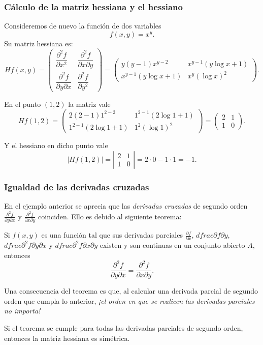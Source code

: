 \begin{frame}
\frametitle{Cálculo de la matriz hessiana y el hessiano}
Consideremos de nuevo la función de dos variables
\[f(x,y)=x^y.\]
Su matriz hessiana es:
\[
Hf(x,y)=\left(
\begin{array}{cc}
\dfrac{\partial^2 f}{\partial x^2} & \dfrac{\partial^2 f}{\partial x \partial y}\\
\dfrac{\partial^2 f}{\partial y \partial x} & \dfrac{\partial^2 f}{\partial y^2} 
\end{array}
\right)
=
\left(
\begin{array}{cc}
y(y-1)x^{y-2} & x^{y-1}(y\log x+1) \\
x^{y-1}(y\log x+1) & x^y(\log x)^2
\end{array}
\right).
\]

En el punto $(1,2)$ la matriz vale
\[
Hf(1,2)=\left(
\begin{array}{cc}
2(2-1)1^{2-2} & 1^{2-1}(2\log 1+1) \\
1^{2-1}(2\log 1+1) & 1^2(\log 1)^2
\end{array}
\right)
=
\left(
\begin{array}{cc}
2 & 1 \\
1 & 0 
\end{array}
\right).
\]

Y el hessiano en dicho punto vale
\[ |Hf(1,2)|=\left|
\begin{array}{cc}
2 & 1 \\
1 & 0
\end{array}
\right|=
2\cdot 0-1\cdot1= -1.\]
\end{frame}


\begin{frame}
\frametitle{Igualdad de las derivadas cruzadas}
En el ejemplo anterior se aprecia que las \emph{derivadas cruzadas} de segundo orden $\frac{\partial^2 f}{\partial y\partial x}$ y $\frac{\partial^2 f}{\partial x\partial y}$ coinciden. Ello es debido al siguiente teorema: 

\begin{teorema}
Si $f(x,y)$ es una función tal que sus derivadas parciales $\frac{\partial f}{\partial x}$, $dfrac{\partial f}{\partial y}$, $dfrac{\partial^2 f}{\partial y\partial x}$ y $dfrac{\partial^2 f}{\partial x\partial y}$ existen y son continuas en un conjunto abierto $A$, entonces
\[
\frac{\partial^2 f}{\partial y\partial x}=\frac{\partial^2 f}{\partial x\partial y}.
\]
\end{teorema}

Una consecuencia del teorema es que, al calcular una derivada parcial de segundo orden que cumpla lo anterior, \alert{\emph{¡el orden en que se realicen las derivadas parciales no importa!}}

Si el teorema se cumple para todas las derivadas parciales de segundo orden, entonces la matriz hessiana es simétrica. 
\end{frame}
